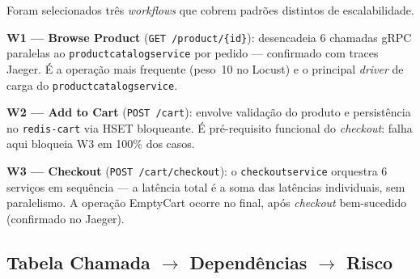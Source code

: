 \documentclass[acmsmall,screen=true,nonacm]{acmart}
\begin{document}
Foram selecionados três \textit{workflows} que cobrem padrões distintos de escalabilidade.

\textbf{W1 — Browse Product} (\texttt{GET /product/\{id\}}): desencadeia 6 chamadas gRPC paralelas ao \texttt{productcatalogservice} por pedido — confirmado com traces Jaeger. É a operação mais frequente (peso~10 no Locust) e o principal \textit{driver} de carga do \texttt{productcatalogservice}.

\textbf{W2 — Add to Cart} (\texttt{POST /cart}): envolve validação do produto e persistência no \texttt{redis-cart} via HSET bloqueante. É pré-requisito funcional do \textit{checkout}: falha aqui bloqueia W3 em 100\% dos casos.

\textbf{W3 — Checkout} (\texttt{POST /cart/checkout}): o \texttt{checkoutservice} orquestra 6 serviços em sequência — a latência total é a soma das latências individuais, sem paralelismo. A operação EmptyCart ocorre no final, após \textit{checkout} bem-sucedido (confirmado no Jaeger).


\subsection{Tabela Chamada $\rightarrow$ Dependências $\rightarrow$ Risco}

\begin{table}[h]
\caption{Análise de risco por chamada nos três workflows. Risco: ALTO = caminho crítico com fan-out, dependência \textit{stateful} ou bloqueio em cascata.}
\label{tab:risco}
\end{table}
\end{document}
